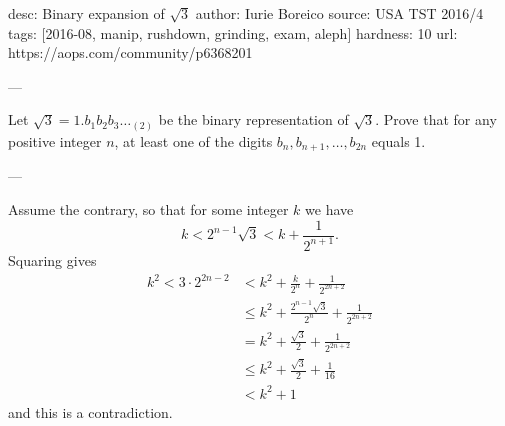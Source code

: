 desc: Binary expansion of $\sqrt3$
author: Iurie Boreico
source: USA TST 2016/4
tags: [2016-08, manip, rushdown, grinding, exam, aleph]
hardness: 10
url: https://aops.com/community/p6368201

---

Let $\sqrt{3}=1.b_1b_2b_3\dots_{(2)}$ be the binary representation
of $\sqrt 3$. Prove that for any positive integer $n$, at least one of
the digits $b_n, b_{n+1}, \dots, b_{2n}$ equals 1.

---

Assume the contrary, so that for some integer $k$ we have
\[k < 2^{n-1} \sqrt 3 < k + \frac{1}{2^{n+1}}. \]
Squaring gives
\begin{align*}
k^2 < 3 \cdot 2^{2n-2} &< k^2 + \frac{k}{2^n} + \frac{1}{2^{2n+2}} \\
&\le k^2 + \frac{2^{n-1} \sqrt 3}{2^n} + \frac{1}{2^{2n+2}} \\
&= k^2 + \frac{\sqrt3}{2} + \frac{1}{2^{2n+2}} \\
&\le k^2 + \frac{\sqrt3}{2} + \frac{1}{16} \\
&< k^2+1
\end{align*}
and this is a contradiction.

